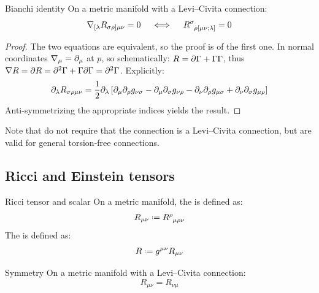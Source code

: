 \begin{theorem}{Bianchi identity}{}
  On a metric manifold with a Levi--Civita connection:
  \begin{equation}
    \na_{[\lambda} R_{\sigma \rho] \mu \nu} = 0
    \quad \iff \quad
    \tensor{R}{^\sigma_{\rho [\mu \nu ; \lambda]}} = 0
    \label{eq:riemann-bianchi}
  \end{equation}
\end{theorem}

\begin{proofbox}
  \begin{proof}
    The two equations are equivalent, so the proof is of the first one. In normal coordinates $ \nabla_\mu = \partial_\mu $ at $ p $, so schematically: $ R = \partial \Gamma + \Gamma \Gamma $, thus $ \nabla R = \partial R = \partial^2 \Gamma + \Gamma \partial \Gamma = \partial^2 \Gamma $. Explicitly:
    \begin{equation*}
      \partial_\lambda R_{\sigma \rho \mu \nu} = \frac{1}{2} \partial_\lambda \left[ \partial_\mu \partial_\rho g_{\nu \sigma} - \partial_\mu \partial_\sigma g_{\nu \rho} - \partial_\nu \partial_\rho g_{\mu \sigma} + \partial_\nu \partial_\sigma g_{\mu \rho} \right]
    \end{equation*}
    Anti-symmetrizing the appropriate indices yields the result.
  \end{proof}
\end{proofbox}

Note that  do not require that the connection is a Levi--Civita connection, but are valid for general torsion-free connections.

\subsection{Ricci and Einstein tensors}

\begin{definition}{Ricci tensor and scalar}{}
  On a metric manifold, the  is defined as:
  \begin{equation}
    R_{\mu \nu} \defeq \tensor{R}{^\rho _{\mu \rho \nu}}
  \end{equation}
  The  is defined as:
  \begin{equation}
    R \defeq g^{\mu \nu} R_{\mu \nu}
  \end{equation}
\end{definition}

\begin{proposition}{Symmetry}{}
  On a metric manifold with a Levi--Civita connection:
  \begin{equation}
    R_{\mu \nu} = R_{\nu \mu}
  \end{equation}
\end{proposition}

